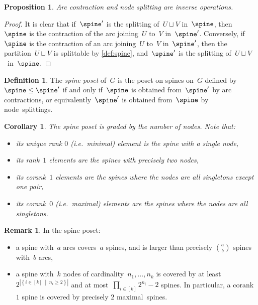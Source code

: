 \documentclass{amsart}
\newtheorem{corollary}[theorem]{Corollary}
\newtheorem{proposition}[theorem]{Proposition}
\theoremstyle{definition}
\newtheorem{definition}[theorem]{Definition}
\newtheorem{remark}[theorem]{Remark}
\newcommand{\set}[2]{\left\{ #1 \;\middle|\; #2 \right\}} %
\newcommand{\ie}{\textit{i.e.}~} %
\newcommand{\darkblue}{\color{darkblue}} %
\newcommand{\defn}[1]{\textsl{\darkblue #1}} %
\begin{document}
\begin{proposition}
  \label{prop:contractionSplitting}
  Arc contraction and node splitting are inverse operations.
\end{proposition}

\begin{proof}
  It is clear that if~$\spine'$ is the splitting of~$U \sqcup V$ in~$\spine$, then~$\spine$ is the contraction of the arc joining~$U$ to~$V$ in~$\spine'$.
  Conversely, if~$\spine$ is the contraction of an arc joining~$U$ to~$V$ in~$\spine'$, then the partition~$U \sqcup V$ is splittable by \cref{def:spine}, and~$\spine'$ is the splitting of~$U \sqcup V$~in~$\spine$.
\end{proof}

\begin{definition}
  The \defn{spine poset} of~$G$ is the poset on spines on~$G$ defined by~$\spine \le \spine'$ if and only if~$\spine$ is obtained from~$\spine'$ by arc contractions, or equivalently~$\spine'$ is obtained from~$\spine$ by node~splittings.
\end{definition}

\begin{corollary} 
 The spine poset is graded by the number of nodes.
 Note that:
 \begin{itemize}
   \item its unique rank $0$ (\ie minimal) element is the spine with a single node, 
   \item its rank~$1$ elements are the spines with precisely two nodes, 
   \item its corank~$1$ elements are the spines where the nodes are all singletons except one pair,
   \item its corank~$0$ (\ie maximal) elements are the spines where the nodes are all singletons.
 \end{itemize}
\end{corollary}

\begin{remark}
  In the spine poset:
  \begin{itemize}
    \item a spine with~$a$ arcs covers~$a$ spines, and is larger than precisely $\binom{a}{b}$ spines with~$b$ arcs,
    \item a spine with~$k$ nodes of cardinality~$n_1, \dots, n_k$ is covered by at least~$2^{|\set{i \in [k]}{n_i \ge 2}|}$ and at most~$\prod_{i \in [k]} 2^{n_i}-2$ spines. In particular, a corank~$1$ spine is covered by precisely $2$ maximal~spines.
  \end{itemize}
\end{remark}
\end{document}
